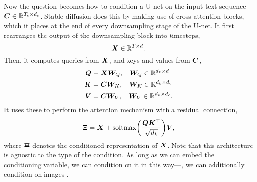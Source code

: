 Now the question becomes how to condition a U-net on the input text sequence $\bm{C} \in \mathbb{R}^{T_c
        \times d_c}$. Stable diffusion \citep{rombach2022high} does this by making use of cross-attention
blocks, which it places at the end of every downsampling stage of the U-net. It first rearranges
the output of the downsampling block into timesteps, \[
    \bm{X} \in \mathbb{R}^{T \times d}.
\]
Then, it computes queries from $\bm{X}$, and keys and values from $\bm{C}$,
\begin{align*}
    \bm{Q} & = \bm{X} \bm{W}_Q, \quad \bm{W}_Q \in \mathbb{R}^{d_k \times d}    \\
    \bm{K} & = \bm{C} \bm{W}_K, \quad \bm{W}_K \in \mathbb{R}^{d_k \times d_c}  \\
    \bm{V} & = \bm{C} \bm{W}_V, \quad \bm{W}_V \in \mathbb{R}^{d_v \times d_c}.
\end{align*}
It uses these to perform the attention mechanism with a residual connection, \[
    \mat{\Xi} = \mat{X} + \mathrm{softmax} \lft( \frac{\mat{Q} \transpose{\mat{K}}}{\sqrt{d_k}} \rgt) \mat{V},
\]
where $\bm{\Xi}$ denotes the conditioned representation of $\bm{X}$. Note that this architecture
is agnostic to the type of the condition. As long as we can embed the conditioning variable, we can
condition on it in this way---\eg, we can additionally condition on images \citep{ye2023ip}.
